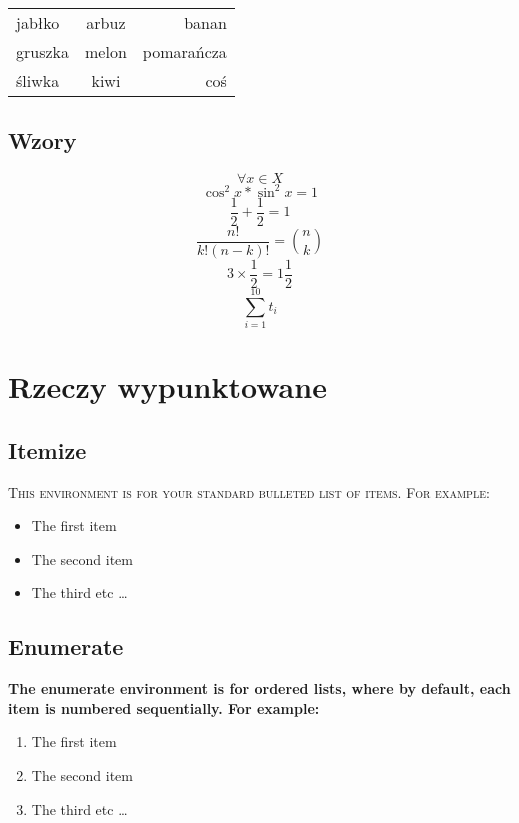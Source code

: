 \documentclass[pdftex,a4paper,10pt]{report}
\begin{document}
\begin{tabular}{ l c r }
		jabłko & arbuz & banan \\
		gruszka & melon & pomarańcza \\
		śliwka & kiwi & coś \\
\end{tabular}
\section{Wzory}
\label{sec;sec2.2}
$$ \forall x \in X $$
$$ \cos^2 x * \sin^2 x = 1$$
$$ \frac{1}{2} + \frac{1}{2} = 1 $$ 
$$ \frac{n!}{k!(n-k)!} = \binom{n}{k} $$ 
$$ 3\times\frac{1}{2}=1\frac{1}{2} $$
$$ \sum_{i=1}^{10} t_i $$


\chapter{Rzeczy wypunktowane}
\label{cha;chap3}
{}\cite{wiki}
\section{Itemize}
\label{sec;sec3.1}
{\scshape This environment is for your standard bulleted list of items.\cite{wiki} For example:}
\begin{itemize}
  \item The first item
  \item The second item
  \item The third etc \ldots
\end{itemize}
\section{Enumerate}
\label{sec;sec3.2}
{\bfseries The enumerate environment is for ordered lists, where by default, each item is numbered sequentially.\cite{wiki} For example:}
\begin{enumerate}
  \item The first item
  \item The second item
  \item The third etc \ldots
\end{enumerate}
\newpage
\end{document}
